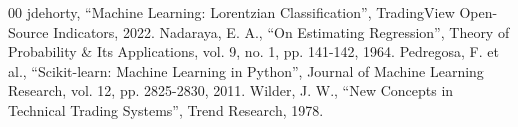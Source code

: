 \documentclass[conference]{IEEEtran}
\begin{document}
\begin{thebibliography}{00}
 jdehorty, ``Machine Learning: Lorentzian Classification'', TradingView Open-Source Indicators, 2022.
 Nadaraya, E. A., ``On Estimating Regression'', Theory of Probability \& Its Applications, vol. 9, no. 1, pp. 141-142, 1964.
 Pedregosa, F. et al., ``Scikit-learn: Machine Learning in Python'', Journal of Machine Learning Research, vol. 12, pp. 2825-2830, 2011.
 Wilder, J. W., ``New Concepts in Technical Trading Systems'', Trend Research, 1978.
\end{thebibliography}
\end{document}

